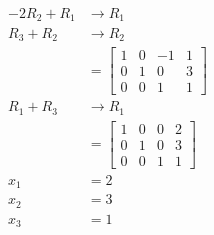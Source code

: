 \documentclass[letterpaper, 12pt]{math}
\begin{document}
\begin{multicols}{2}
\begin{align*}
    -2R_2+R_1 &\to R_1 \\
    R_3+R_2 &\to R_2 \\
    &= \begin{bmatrix}
      1 & 0 & -1 & 1 \\
      0 & 1 & 0 & 3 \\
      0 & 0 & 1 & 1
    \end{bmatrix} \\
    R_1+R_3 &\to R_1 \\
    &= \begin{bmatrix}
      1 & 0 & 0 & 2 \\
      0 & 1 & 0 & 3 \\
      0 & 0 & 1 & 1
    \end{bmatrix} \\
    x_1 &= 2 \\
    x_2 &= 3 \\
    x_3 &= 1
  \end{align*}
\end{multicols}
\end{document}
